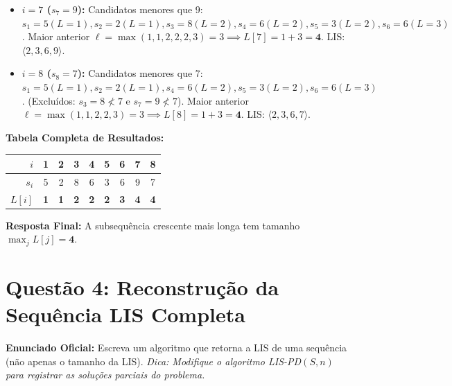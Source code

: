 \documentclass[11pt,a4paper]{article}
\begin{document}
\begin{itemize}
    Maior anterior $\ell = \max(1, 1, 2) = 2 \implies L[6] = 1 + 2 = \mathbf{3}$. LIS: $\langle 2, 3, 6 \rangle$.
    \item \textbf{$i = 7$ ($s_7 = 9$):}
    Candidatos menores que 9: $s_1=5(L=1), s_2=2(L=1), s_3=8(L=2), s_4=6(L=2), s_5=3(L=2), s_6=6(L=3)$.
    Maior anterior $\ell = \max(1, 1, 2, 2, 2, 3) = 3 \implies L[7] = 1 + 3 = \mathbf{4}$. LIS: $\langle 2, 3, 6, 9 \rangle$.
    \item \textbf{$i = 8$ ($s_8 = 7$):}
    Candidatos menores que 7: $s_1=5(L=1), s_2=2(L=1), s_4=6(L=2), s_5=3(L=2), s_6=6(L=3)$.
    (Excluídos: $s_3 = 8 \not< 7$ e $s_7 = 9 \not< 7$).
    Maior anterior $\ell = \max(1, 1, 2, 2, 3) = 3 \implies L[8] = 1 + 3 = \mathbf{4}$. LIS: $\langle 2, 3, 6, 7 \rangle$.
\end{itemize}

\textbf{Tabela Completa de Resultados:}
\begin{center}
\begin{tabular}{r|cccccccc}
\toprule
$i$ & 1 & 2 & 3 & 4 & 5 & 6 & 7 & 8 \\
\midrule
$s_i$ & 5 & 2 & 8 & 6 & 3 & 6 & 9 & 7 \\
$L[i]$ & \textbf{1} & \textbf{1} & \textbf{2} & \textbf{2} & \textbf{2} & \textbf{3} & \textbf{4} & \textbf{4} \\
\bottomrule
\end{tabular}
\end{center}

\textbf{Resposta Final:} A subsequência crescente mais longa tem tamanho $\max_j L[j] = \mathbf{4}$.

\vspace{0.4cm}

\section*{Questão 4: Reconstrução da Sequência LIS Completa}

\textbf{Enunciado Oficial:} Escreva um algoritmo que retorna a LIS de uma sequência (não apenas o tamanho da LIS). \emph{Dica: Modifique o algoritmo \textsc{LIS-PD}$(S, n)$ para registrar as soluções parciais do problema.}
\end{document}
